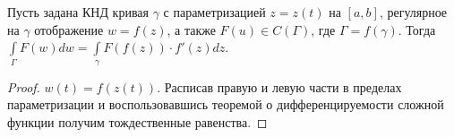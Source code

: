 \begin{statement}
    Пусть задана КНД кривая \(\gamma\) с параметризацией \(z = z(t)\) на \([a, b]\), регулярное на
    \(\gamma\) отображение \(w = f(z)\), а также \(F(u) \in C(\Gamma)\), где \(\Gamma = f(\gamma)\).
    Тогда \(\int\limits_{\Gamma}F(w)dw = \int\limits_{\gamma} F(f(z))\cdot f'(z) dz\).
\end{statement}

\begin{proof}
    \(w(t) = f(z(t))\). Расписав правую и левую части в пределах параметризации и воспользовавшись
    теоремой о дифференцируемости сложной функции получим тождественные равенства.
\end{proof}
